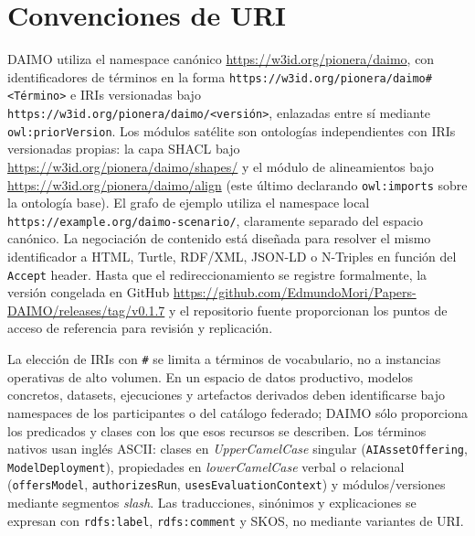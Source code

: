 \documentclass[Afour,sagev,times]{sagej}
\newcommand{\code}[1]{\texttt{#1}}
\begin{document}
\section{Convenciones de URI}\label{app:uris}

DAIMO utiliza el namespace canónico \url{https://w3id.org/pionera/daimo}, con identificadores de términos en la forma \code{https://w3id.org/pionera/daimo\#<Término>} e IRIs versionadas bajo \code{https://w3id.org/pionera/daimo/<versión>}, enlazadas entre sí mediante \code{owl:priorVersion}. Los módulos satélite son ontologías independientes con IRIs versionadas propias: la capa SHACL bajo \url{https://w3id.org/pionera/daimo/shapes/} y el módulo de alineamientos bajo \url{https://w3id.org/pionera/daimo/align} (este último declarando \code{owl:imports} sobre la ontología base). El grafo de ejemplo utiliza el namespace local \code{https://example.org/daimo-scenario/}, claramente separado del espacio canónico. La negociación de contenido está diseñada para resolver el mismo identificador a HTML, Turtle, RDF/XML, JSON-LD o N-Triples en función del \code{Accept} header. Hasta que el redireccionamiento se registre formalmente, la versión congelada en GitHub \url{https://github.com/EdmundoMori/Papers-DAIMO/releases/tag/v0.1.7} y el repositorio fuente proporcionan los puntos de acceso de referencia para revisión y replicación.

La elección de IRIs con \code{\#} se limita a términos de vocabulario, no a instancias operativas de alto volumen. En un espacio de datos productivo, modelos concretos, datasets, ejecuciones y artefactos derivados deben identificarse bajo namespaces de los participantes o del catálogo federado; DAIMO sólo proporciona los predicados y clases con los que esos recursos se describen. Los términos nativos usan inglés ASCII: clases en \emph{UpperCamelCase} singular (\code{AIAssetOffering}, \code{ModelDeployment}), propiedades en \emph{lowerCamelCase} verbal o relacional (\code{offersModel}, \code{authorizesRun}, \code{usesEvaluationContext}) y módulos/versiones mediante segmentos \emph{slash}. Las traducciones, sinónimos y explicaciones se expresan con \code{rdfs:label}, \code{rdfs:comment} y SKOS, no mediante variantes de URI.
\end{document}
